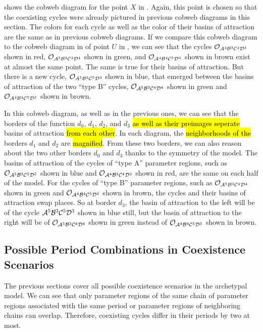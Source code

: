  shows the cobweb diagram for the point $X$ in .
Again, this point is chosen so that the coexisting cycles were already pictured in previous cobweb diagrams in this section.
The colors for each cycle as well as the color of their basins of attraction are the same as in previous cobweb diagrams.
If we compare this cobweb diagram to the cobweb diagram in  of point $U$ in , we can see that the cycles $\mathcal{O}_{\mathcal{A}^4\mathcal{B}^3\mathcal{C}^4\mathcal{D}^3}$ shown in red, $\mathcal{O}_{\mathcal{A}^5\mathcal{B}^3\mathcal{C}^4\mathcal{D}^4}$ shown in green, and $\mathcal{O}_{\mathcal{A}^4\mathcal{B}^4\mathcal{C}^5\mathcal{D}^3}$ shown in brown exist at almost the same point.
The same is true for their basins of attraction.
But there is a new cycle, $\mathcal{O}_{A^5\mathcal{B}^3\mathcal{C}^5\mathcal{D}^3}$ shown in blue, that emerged between the basins of attraction of the two ``type B'' cycles, $\mathcal{O}_{\mathcal{A}^5\mathcal{B}^3\mathcal{C}^4\mathcal{D}^4}$ shown in green and $\mathcal{O}_{\mathcal{A}^4\mathcal{B}^4\mathcal{C}^5\mathcal{D}^3}$ shown in brown.

In this cobweb diagram, as well as in the previous ones, we can see that the borders of the function $d_0$, $d_1$, $d_2$, and $d_3$ \hl{as well as their preimages seperate} basins of attraction \hl{from each other}.
In each diagram, the \hl{neighborhoods of the} borders $d_1$ and $d_2$ are \hl{magnified}.
From these two borders, we can also reason about the two other borders $d_0$ and $d_3$ thanks to the symmetry of the model.
The basins of attraction of the cycles of ``type A'' parameter regions, such as $\mathcal{O}_{\mathcal{A}^5\mathcal{B}^3\mathcal{C}^5\mathcal{D}^3}$ shown in blue and $\mathcal{O}_{\mathcal{A}^4\mathcal{B}^3\mathcal{C}^4\mathcal{D}^3}$ shown in red, are the same on each half of the model.
For the cycles of ``type B'' parameter regions, such as $\mathcal{O}_{\mathcal{A}^5\mathcal{B}^3\mathcal{C}^4\mathcal{D}^4}$ shown in green and $\mathcal{O}_{\mathcal{A}^4\mathcal{B}^4\mathcal{C}^5\mathcal{D}^3}$ shown in brown, the cycles and their basins of attraction swap places.
So at border $d_3$, the basin of attraction to the left will be of the cycle $\mathcal{A}^5\mathcal{B}^3\mathcal{C}^5\mathcal{D}^3$ shown in blue still, but the basin of attraction to the right will be of $\mathcal{O}_{\mathcal{A}^5\mathcal{B}^3\mathcal{C}^4\mathcal{D}^4}$ shown in green instead of $\mathcal{O}_{\mathcal{A}^4\mathcal{B}^4\mathcal{C}^5\mathcal{D}^3}$ shown in brown.

\subsection{Possible Period Combinations in Coexistence Scenarios}

The previous sections cover all possible coexistence scenarios in the archetypal model.
We can see that only parameter regions of the same chain of parameter regions associated with the same period or parameter regions of neighboring chains can overlap.
Therefore, coexisting cycles differ in their periods by two at most.

